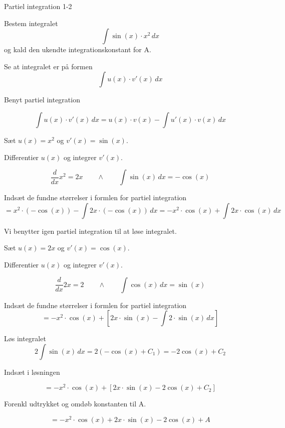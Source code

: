 \documentclass{article}
\begin{document}
\begin{exercise}{Partiel integration 1-2}
	
	
	Bestem integralet
	\[
	\int \sin(x) \cdot x^2 \, dx
	\]
	og kald den ukendte integrationskonstant for A.
	
	
	
	\hint
	
	Se at integralet er på formen
	\[
	\int u(x) \cdot v'(x) \, dx
	\]
	
	\hint
	
	Benyt partiel integration
	
	\hint
	\[
	\int u(x) \cdot v'(x)\, dx = u(x) \cdot v(x) - \int u'(x) \cdot v(x) \, dx
	\]
	\hint
	
	Sæt $u(x) = x^2$ og $v'(x) = \sin(x)$.
	
	
	\hint
	
	Differentier $u(x)$ og integrer $v'(x)$.
	
	\hint
	\[
	\frac{d}{dx}x^2 = 2x \qquad \wedge \qquad \int \sin(x) \, dx = -\cos(x)
	\]
	
	\hint
	
	Indsæt de fundne størrelser i formlen for partiel integration
	\[
	= x^2 \cdot (-\cos(x)) - \int 2x \cdot (-\cos(x)) \, dx = -x^2 \cdot \cos(x) + \int 2x \cdot \cos(x) \, dx 
	\]
	
	\hint
	
	Vi benytter igen partiel integration til at løse integralet.
	
	\hint
	
	Sæt $u(x) = 2x$ og $v'(x) = \cos(x)$.
	
	
	\hint
	
	Differentier $u(x)$ og integrer $v'(x)$.
	
	\hint
	\[
	\frac{d}{dx}2x = 2 \qquad \wedge \qquad \int \cos(x) \, dx = \sin(x)
	\]
	
	\hint
	
	Indsæt de fundne størrelser i formlen for partiel integration
	\[
	= -x^2 \cdot \cos(x) + \left[ 2x \cdot \sin(x) - \int 2 \cdot \sin(x) \, dx \right]
	\]
	
	\hint
	Løs integralet
	\[
	2 \int \sin(x) \, dx = 2 (-\cos(x) + C_1) = -2\cos(x) + C_2
	\]
	
	\hint
	Indsæt i løsningen 
	
	\hint
	
	\[
	= -x^2 \cdot \cos(x) + \left[ 2x \cdot \sin(x) - 2\cos(x) + C_2 \right]
	\]
	
	\hint
	
	Forenkl udtrykket og omdøb konstanten til A.
	
	\hint
	
	\[
	= -x^2 \cdot \cos(x) + 2x \cdot \sin(x) - 2\cos(x) + A
	\]
	
	
\end{exercise}
\end{document}
